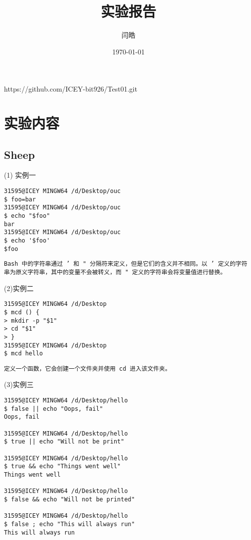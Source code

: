 \documentclass[a4paper, 12pt]{article}
\begin{document}
\title{实验报告}
\author{闫皓}
\date{\today}
\maketitle

\tableofcontents
\newpage
{}

{\color{red}https://github.com/ICEY-bit926/Test01.git}

\section{实验内容}
\subsection{Sheep}
(1) 实例一
\begin{Verbatim}
31595@ICEY MINGW64 /d/Desktop/ouc
$ foo=bar
31595@ICEY MINGW64 /d/Desktop/ouc
$ echo "$foo"
bar
31595@ICEY MINGW64 /d/Desktop/ouc
$ echo '$foo'
$foo
\end{Verbatim}

\texttt{{\color{blue}Bash 中的字符串通过 ' 和 " 分隔符来定义，但是它们的含义并不相同。以 ' 定义的字符串为原义字符串，其中的变量不会被转义，而 " 定义的字符串会将变量值进行替换。} }

(2)实例二
\begin{Verbatim}
31595@ICEY MINGW64 /d/Desktop
$ mcd () {
> mkdir -p "$1"
> cd "$1"
> }
31595@ICEY MINGW64 /d/Desktop
$ mcd hello
\end{Verbatim}

\texttt{{\color{blue}定义一个函数，它会创建一个文件夹并使用 cd 进入该文件夹。}}

(3)实例三
\begin{Verbatim}
31595@ICEY MINGW64 /d/Desktop/hello
$ false || echo "Oops, fail"
Oops, fail

31595@ICEY MINGW64 /d/Desktop/hello
$ true || echo "Will not be print"

31595@ICEY MINGW64 /d/Desktop/hello
$ true && echo "Things went well"
Things went well

31595@ICEY MINGW64 /d/Desktop/hello
$ false && echo "Will not be printed"

31595@ICEY MINGW64 /d/Desktop/hello
$ false ; echo "This will always run"
This will always run
\end{Verbatim}
\end{document}
